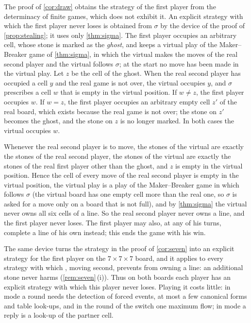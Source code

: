 \begin{remark}\label{rem:first-player}
The proof of \cref{cor:draw} obtains the strategy of the first player from the determinacy of finite games,
which does not exhibit it. An explicit strategy with which the first player never loses is obtained from
$\sigma$ by the device of the proof of \cref{prop:stealing}; it uses only \cref{thm:sigma}. The first player
occupies an arbitrary cell, whose stone is marked as the \emph{ghost}, and keeps a virtual play of the
Maker--Breaker game of \cref{thm:sigma}, in which the virtual \Maker{} makes the moves of the real second
player and the virtual \Breaker{} follows $\sigma$; at the start no move has been made in the virtual play.
Let $z$ be the cell of the ghost. When the real second player has occupied a cell $y$ and the real game is
not over, the virtual \Maker{} occupies $y$, and $\sigma$ prescribes a cell $w$ that is empty in the virtual
position. If $w\ne z$, the first player occupies $w$. If $w=z$, the first player occupies an arbitrary empty
cell $z'$ of the real board, which exists because the real game is not over; the stone on $z'$ becomes the
ghost, and the stone on $z$ is no longer marked. In both cases the virtual \Breaker{} occupies $w$.

Whenever the real second player is to move, the stones of the virtual \Maker{} are exactly the stones of the
real second player, the stones of the virtual \Breaker{} are exactly the stones of the real first player other
than the ghost, and $z$ is empty in the virtual position. Hence the cell of every move of the real second
player is empty in the virtual position, the virtual play is a play of the Maker--Breaker game in which \Breaker{}
follows $\sigma$ (the virtual board has one empty cell more than the real one, so $\sigma$ is asked for a
move only on a board that is not full), and by \cref{thm:sigma} the virtual \Maker{} never owns all six
cells of a line. So the real second player never owns a line, and the first player never loses. The first
player may also, at any of his turns, complete a line of his own instead; this ends the game with his win.

The same device turns the strategy in the proof of \cref{cor:seven} into an explicit strategy for the first
player on the $7\times7\times7$ board, and it applies to every strategy with which \Breaker, moving second,
prevents \Maker{} from owning a line: an additional stone never harms \Breaker{} (\cref{rem:seven}\,(i)).
Thus on both boards each player has an explicit strategy with which this player never loses. Playing it
costs little: in \TABLE{} mode a round needs the detection of forced events, at most a few canonical forms
and table look-ups, and in the round of the switch one maximum flow; in \PAIRING{} mode a reply is a
look-up of the partner cell.
\end{remark}

